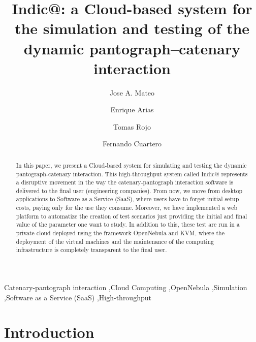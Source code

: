 \documentclass[final,1p,times]{elsarticle}
\begin{document}
\begin{frontmatter}

\title{Indic@: a Cloud-based system for the simulation and testing of the dynamic
pantograph–catenary interaction
}


\author[albacete]{Jose A. Mateo}

\author[albacete]{Enrique Arias}

\author[albacete]{Tomas Rojo}

\author[albacete]{Fernando Cuartero}

\address[albacete]{Universidad de Castilla-La Mancha, Albacete, Spain, 02071.}

\begin{abstract}
In this paper, we present a Cloud-based system for simulating and 
testing the dynamic pantograph-catenary interaction.
This high-throughput system called Indic@ represents a disruptive movement in the way 
the catenary-pantograph interaction software is
delivered to the final user (engineering companies). From now, we move 
from desktop applications to Software as a Service (SaaS), 
where users have to forget initial setup costs, paying only 
for the use they consume. Moreover, we have implemented a web platform to
automatize the creation of test scenarios just providing the initial and final
value of the parameter one want to study. In addition to this, these test are run in
a private cloud deployed using the framework OpenNebula and KVM, where the deployment of the
virtual machines and the maintenance of the computing infrastructure 
is completely transparent to the final user. 

\end{abstract}

\begin{keyword}
 Catenary-pantograph interaction \sep Cloud Computing \sep OpenNebula \sep Simulation \sep Software as a Service (SaaS) \sep High-throughput
\end{keyword}

\end{frontmatter}

\section{Introduction}\label{sec:introduction}

\end{document}
